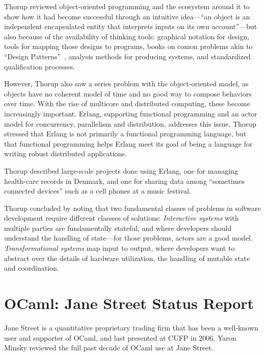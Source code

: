 \documentclass{jfp1}
\begin{document}
Thorup reviewed object-oriented programming and the ecosystem around
it to show how it had become successful through an intuitive
idea---``an object is an independent encapsulated entity that
interprets
inputs on its own account''---but also because of the availability of
thinking tools: graphical notation for design, tools for mapping those
designs to programs, books on comon problems akin to ``Design
Patterns''~\cite{GammaHelmJohnsonVlissides1995}, analysis methods for producing systems,
and standardized qualification processes.

However, Thorup also saw a series problem with the object-oriented model,
as objects have no coherent model of time and no good way to compose
behaviors over time.  With the rise of multicore and distributed
computing, these become increasingly important.  Erlang, supporting
functional programming and an actor model for concurrency, parallelism
and distribution, addresses this issue.  Thorup stressed that Erlang
is not primarily a functional programming language, but that
functional programming helps Erlang meet its goal of being a
language for writing robust distributed applications.

Thorup described large-scale projects done using Erlang, one for
managing health-care records in Denmark, and one for sharing data
among ``sometimes connected devices'' such as a cell phones at a music
festival.

Thorup concluded by noting that two fundamental classes of problems in
software development require different classses of solutions:
\textit{Interactive systems} with multiple parties are fundamentally
stateful, and where developers should understand the handling of
state---for those problems, actors are a good model.
\textit{Transformational systems} map input to output, where
developers want to abstract over the details of hardware utilization,
the handling of mutable state and coordination.

\section{OCaml: Jane Street Status Report}

Jane Street is a quantitative proprietary trading firm that has been a
well-known user and supporter of OCaml, and last presented at CUFP in
2006.  Yaron Minsky reviewed the full past decade of OCaml use at Jane Street.
\end{document}
